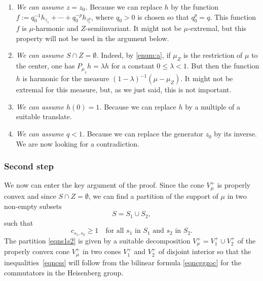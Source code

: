 \documentclass[11pt]{article}
\numberwithin{equation}{section}
\newenvironment{enumeratea}
{\bgroup\def\theenumi{\alph{enumi}}\begin{enumerate}}
{\end{enumerate}\egroup}
\theoremstyle{definition}
\let\la\lambda
\begin{document}
\begin{enumeratea}
\item\label{enum:a}
\emph{We can assume $z=z_0$.}
Because we can replace $h$ by
the function $f:= q_0^{-1}h_{z_{_0}} +\cdots + q_0^{-p}h_{z_{_0}^{p}}$,
where $q_0>0$ is chosen so that $q_0^p=q$. This function $f$ is
$\mu$-harmonic and $Z$-semiinvariant. It might not be $\mu$-extremal,
but this property will not be used in the argument below.

\item
\emph{We can assume $S\cap Z=\emptyset$.} Indeed, by \eqref{enum:a}, if $\mu_Z$ is the restriction of
$\mu$ to the center, one has $P_{\mu_{_Z}}h=\la h$ for a constant $0\leq \la <1$.
But then the function $h$ is harmonic for the measure $(1-\la)^{-1}(\mu-\mu_Z)$.
It might not be extremal for this measure,
but, as we just said, this is not important.

\item
\emph{We can assume $h(0)= 1$.}
Because we can replace $h$ by a multiple of a suitable translate.

\item
\emph{We can assume $q< 1$.} Because we can replace the generator $z_0$
by its inverse. We are now looking for a contradiction.
\end{enumeratea}

\subsubsection*{Second step}
We now can enter the key argument of the proof.
Since the cone $V_\mu^+$ is properly convex and since $S\cap Z=\emptyset$,
we can find a partition of the support of $\mu$ in two non-empty subsets
\begin{equation}
\label{eqns1s2}
S=S_1\cup S_2,
\end{equation}
such that
\begin{equation}
\label{eqncss}
c_{s_1,s_2}\geq 1\quad
\text{for all $s_1$ in $S_1$ and $s_2$ in $S_2$.}
\end{equation}
The partition \eqref{eqns1s2} is given by a suitable decomposition
$V_\mu^+=V_1^+\cup V_2^+$ of the properly convex cone $V_\mu^+$
in two cones $V_1^+$ and $V_2^+$ of disjoint interior so that
the inequalities~\eqref{eqncss} will follow from the bilinear formula \eqref{eqncggzoc}
for the commutators in the Heisenberg group.
\end{document}

